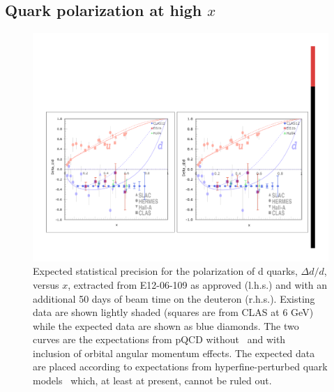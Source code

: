 \subsection{Quark polarization at high $x$}

\begin{figure}[htb!]
\begin{center}
\includegraphics[width=\linewidth]{dis/NewHighX.pdf}
\end{center}
\caption{\baselineskip 13pt \small
Expected statistical precision for the polarization of d quarks, $\Delta d / d$, versus $x$, extracted from E12-06-109 as approved
(l.h.s.) and with an additional 50 days of beam time on the deuteron (r.h.s.). Existing data are shown lightly shaded
(squares are from CLAS at 6 GeV) while the expected data are shown as blue diamonds. The two curves are
the expectations from pQCD without~\cite{Brodsky:1994kg}  and with~\cite{Avakian:2007xa} inclusion of orbital angular momentum effects. The expected data are placed according to expectations from hyperfine-perturbed quark models~\cite{Isgur:1998yb} which,
at least at present, cannot be ruled out.}
\label{highXexp}
\end{figure}


